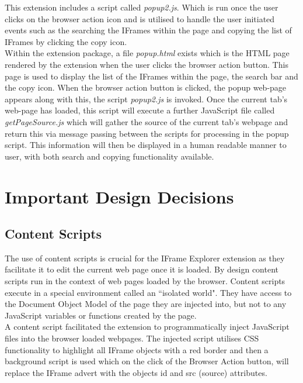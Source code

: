 \documentclass[12pt]{article}
\begin{document}
This extension includes a script called \textit{popup2.js}. Which is run once the user clicks on the browser action icon and is utilised to handle the user initiated events such as the searching the IFrames within the page and copying the list of IFrames by clicking the copy icon. \\

Within the extension package, a file \textit{popup.html} exists which is the HTML page rendered by the extension when the user clicks the browser action button. This page is used to display the list of the IFrames within the page, the search bar and the copy icon. When the browser action button is clicked, the popup web-page appears along with this, the script \textit{popup2.js} is invoked. Once the current tab's web-page has loaded, this script will execute a further JavaScript file called \textit{getPageSource.js} which will gather the source of the current tab's webpage and return this via message passing between the scripts for processing in the popup script. This information will then be displayed in a human readable manner to user, with both search and copying functionality available.

\pagebreak

\section{Important Design Decisions}

\subsection{Content Scripts} \label{Content_Scripts}
The use of content scripts is crucial for the IFrame Explorer extension as they facilitate it to edit the current web page once it is loaded. By design content scripts run in the context of web pages loaded by the browser. Content scripts execute in a special environment called an ``isolated world". They have access to the Document Object Model of the page they are injected into, but not to any JavaScript variables or functions created by the page. \\ 

A content script facilitated the extension to programmatically inject JavaScript files into the browser loaded webpages. The injected script utilises CSS functionality to highlight all IFrame objects with a red border and then a background script is used which on the click of the Browser Action button, will replace the IFrame advert with the objects id and src (source) attributes.  \\
\end{document}
